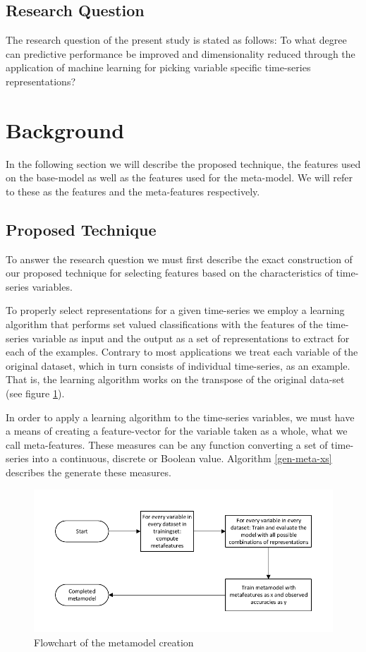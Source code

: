 \documentclass[conference]{IEEEtran}
\begin{document}
\subsection{Research Question}
The research question of the present study is stated as follows: To what degree can predictive performance be improved and dimensionality reduced through the application of machine learning for picking variable specific time-series representations?

\section{Background}

In the following section we will describe the proposed technique, the features used on the base-model as well as the features used for the meta-model. We will refer to these as the features and the meta-features respectively.

\subsection{Proposed Technique}

To answer the research question we must first describe the exact construction of our proposed technique for selecting features based on the characteristics of time-series variables.

To properly select representations for a given time-series we employ a learning algorithm that performs set valued classifications with the features of the time-series variable as input and the output as a set of representations to extract for each of the examples. Contrary to most applications we treat each variable of the original dataset, which in turn consists of individual time-series, as an example. That is, the learning algorithm works on the transpose of the original data-set (see figure \ref{fig_metamodel}).

In order to apply a learning algorithm to the time-series variables, we must have a means of creating a feature-vector for the variable taken as a whole, what we call meta-features. These measures can be any function converting a set of time-series into a continuous, discrete or Boolean value. Algorithm \ref{gen-meta-xs} describes the generate these measures.

\begin{figure}[!t]
\centering
\includegraphics[width=.45\textwidth]{Drawing4.pdf}
\caption{Flowchart of the metamodel creation}
\label{fig_metamodel}
\end{figure}
\end{document}
